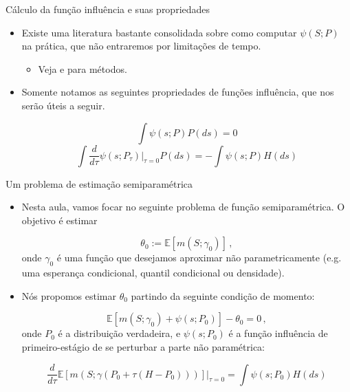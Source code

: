 \documentclass[11pt]{beamer}
\begin{document}
\begin{frame}{Cálculo da função influência e suas propriedades}
\begin{itemize}
	\item 	Existe uma literatura bastante consolidada sobre como computar $\psi(S;P)$ na prática, que não entraremos por limitações de tempo.
	\begin{itemize}
		\item Veja \citet{Ichimura2022} e \citet{kennedy2023semiparametric} para métodos.
	\end{itemize}
	\item Somente notamos as seguintes propriedades de funções influência, que nos serão úteis a seguir.
	
	$$\int \psi(s;P) P(ds) = 0$$
	$$\int \frac{d}{d \tau}\psi(s;P_\tau)\Big|_{\tau = 0} P(ds) = - \int \psi(s;P) H(ds) $$
\end{itemize}
\end{frame}

\begin{frame}{Um problema de estimação semiparamétrica}
\begin{itemize}
	\item Nesta aula, vamos focar no seguinte problema de função semiparamétrica. O objetivo é estimar
	
	$$\theta_0 := \mathbb{E}[m(S;\gamma_0)]\,,$$
	onde $\gamma_0$ é uma função que desejamos aproximar não parametricamente (e.g. uma esperança condicional, quantil condicional ou densidade).
	
	\item Nós propomos estimar $\theta_0$ partindo da seguinte condição de momento:
	
	$$ \mathbb{E}[m(S;\gamma_0) + \psi(s;P_0)] - \theta_0 = 0\,,$$
	onde $P_0$ é a distribuição verdadeira, e $\psi(s;P_0)$ é a {\color{blue}função influência de primeiro-estágio} de se perturbar a parte não paramétrica:
	
	$$\frac{d}{d \tau}\mathbb{E}[m(S;\gamma(P_0+\tau (H-P_0)))]\Big|_{\tau=0} = \int \psi(s;P_0)H(ds)$$
	
\end{itemize}
\end{frame}
\end{document}
